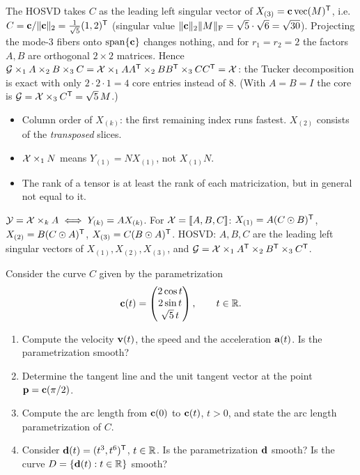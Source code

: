 \begin{solution}
The HOSVD takes $C$ as the leading left singular vector of $X_{(3)}=\mathbf{c}\operatorname{vec}(M)^{\mathsf{T}}$, i.e.
$C=\mathbf{c}/\lVert \mathbf{c}\rVert_2=\frac1{\sqrt5}(1,2)^{\mathsf{T}}$ (singular value $\lVert \mathbf{c}\rVert_2\lVert M\rVert_{\mathrm F}=\sqrt5\cdot\sqrt6=\sqrt{30}$).
Projecting the mode-3 fibers onto $\operatorname{span}\{\mathbf{c}\}$ changes nothing, and for $r_1=r_2=2$ the factors $A,B$ are orthogonal $2\times2$ matrices. Hence
$\mathcal{G}\times_1A\times_2B\times_3C=\mathcal{X}\times_1AA^{\mathsf{T}}\times_2BB^{\mathsf{T}}\times_3CC^{\mathsf{T}}=\mathcal{X}$: the Tucker decomposition is exact with only $2\cdot2\cdot1=4$ core entries instead of 8. (With $A=B=I$ the core is $\mathcal{G}=\mathcal{X}\times_3C^{\mathsf{T}}=\sqrt5\,M$.) 

\begin{trap}
\begin{itemize}
\item Column order of $X_{(k)}$: the first remaining index runs fastest. $X_{(2)}$ consists of the \emph{transposed} slices.
\item $\mathcal{X}\times_1N$ means $Y_{(1)}=NX_{(1)}$, not $X_{(1)}N$.
\item The rank of a tensor is at least the rank of each matricization, but in general not equal to it.
\end{itemize}
\end{trap}
\begin{heart}
$\mathcal{Y}=\mathcal{X}\times_kA\iff Y_{(k)}=AX_{(k)}$. For $\mathcal{X}=[\![A,B,C]\!]$: $X_{(1)}=A(C\odot B)^{\mathsf{T}}$, $X_{(2)}=B(C\odot A)^{\mathsf{T}}$, $X_{(3)}=C(B\odot A)^{\mathsf{T}}$.
HOSVD: $A,B,C$ are the leading left singular vectors of $X_{(1)},X_{(2)},X_{(3)}$, and $\mathcal{G}=\mathcal{X}\times_1A^{\mathsf{T}}\times_2B^{\mathsf{T}}\times_3C^{\mathsf{T}}$.
\end{heart}
\end{solution}

Consider the curve $C$ given by the parametrization
\[
\mathbf{c}(t)=\begin{pmatrix}2\cos t\\2\sin t\\\sqrt5\,t\end{pmatrix},\qquad t\in\mathbb{R}.
\]
\begin{enumerate}
\item Compute the velocity $\mathbf{v}(t)$, the speed and the acceleration $\mathbf{a}(t)$. Is the parametrization smooth?
\item Determine the tangent line and the unit tangent vector at the point $\mathbf{p}=\mathbf{c}(\pi/2)$.
\item Compute the arc length from $\mathbf{c}(0)$ to $\mathbf{c}(t)$, $t>0$, and state the arc length parametrization of $C$.
\item Consider $\mathbf{d}(t)=(t^3,t^6)^{\mathsf{T}}$, $t\in\mathbb{R}$. Is the parametrization $\mathbf{d}$ smooth? Is the curve $D=\{\mathbf{d}(t):t\in\mathbb{R}\}$ smooth?
\end{enumerate}

